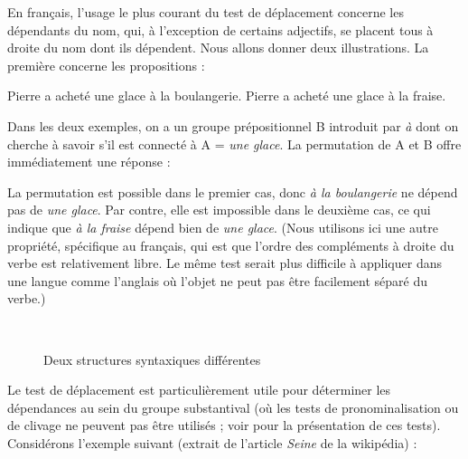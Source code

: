 En français, l’usage le plus courant du test de déplacement concerne les dépendants du nom, qui, à l’exception de certains adjectifs, se placent tous à droite du nom dont ils dépendent. Nous allons donner deux illustrations. La première concerne les propositions :

\ea
  \ea Pierre a acheté une glace à la boulangerie.
  \ex Pierre a acheté une glace à la fraise.
  \z
\z

Dans les deux exemples, on a un groupe prépositionnel B introduit par \textit{à} dont on cherche à savoir s’il est connecté à A = \textit{une glace}. La permutation de A et B offre immédiatement une réponse :
\ea
    \z
\z

La permutation est possible dans le premier cas, donc \textit{à la boulangerie} ne dépend pas de \textit{une glace}. Par contre, elle est impossible dans le deuxième cas, ce qui indique que \textit{à la fraise} dépend bien de \textit{une glace}. (Nous utilisons ici une autre propriété, spécifique au français, qui est que l’ordre des compléments à droite du verbe est relativement libre. Le même test serait plus difficile à appliquer dans une langue comme l’anglais où l’objet ne peut pas être facilement séparé du verbe.)

\begin{figure}
\medskip\\
\caption{\label{fig:}Deux structures syntaxiques différentes}
\end{figure}

Le test de déplacement est particulièrement utile pour déterminer les dépendances au sein du groupe substantival (où les tests de pronominalisation ou de clivage ne peuvent pas être utilisés ; voir  pour la présentation de ces tests). Considérons l’exemple suivant (extrait de l’article \textit{Seine} de la wikipédia) :

